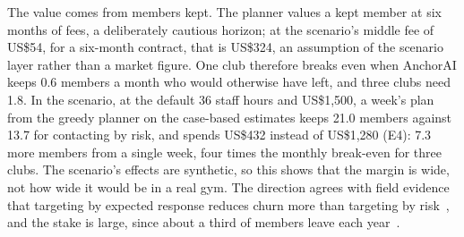 The value comes from members kept. The planner values a kept member at six months of fees, a deliberately cautious horizon; at the scenario's middle fee of US\$54, for a six-month contract, that is US\$324, an assumption of the scenario layer rather than a market figure. One club therefore breaks even when AnchorAI keeps 0.6 members a month who would otherwise have left, and three clubs need 1.8. In the scenario, at the default 36 staff hours and US\$1,500, a week's plan from the greedy planner on the case-based estimates keeps 21.0 members against 13.7 for contacting by risk, and spends US\$432 instead of US\$1,280 (E4): 7.3 more members from a single week, four times the monthly break-even for three clubs. The scenario's effects are synthetic, so this shows that the margin is wide, not how wide it would be in a real gym. The direction agrees with field evidence that targeting by expected response reduces churn more than targeting by risk~\cite{ascarza2018futility}, and the stake is large, since about a third of members leave each year~\cite{hfa2025benchmarking}.
